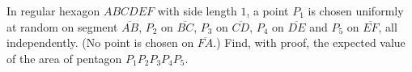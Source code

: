In regular hexagon $ABCDEF$ with side length $1$, a point $P_1$ is chosen uniformly at random on segment $\overline{AB}$, $P_2$ on $\overline{BC}$, $P_3$ on $\overline{CD}$, $P_4$ on $\overline{DE}$ and $P_5$ on $\overline{EF}$, all independently. (No point is chosen on $\overline{FA}$.) Find, with proof, the expected value of the area of pentagon $P_1P_2P_3P_4P_5$.
